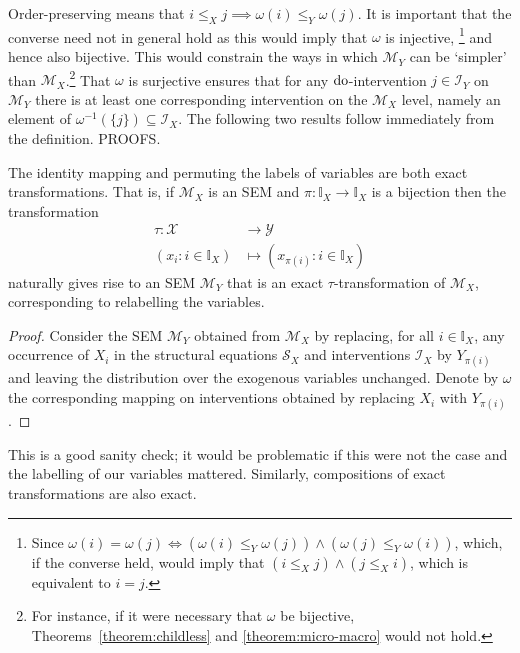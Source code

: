 Order-preserving means that ${i \leq_X j \implies \omega(i) \leq_Y \omega(j)}$.
It is important that the converse need not in general hold as this would imply that $\omega$ is injective,%
\footnote{Since ${\omega(i)=\omega(j) \iff \left(\omega(i) \leq_Y \omega(j)\right) \land \left(\omega(j) \leq_Y \omega(i)\right)}$, which, if the converse held, would imply that $\left(i \leq_X j\right) \land \left(j \leq_X i\right)$, which is equivalent to $i=j$.}
and hence also bijective.
This would constrain the ways in which $\mathcal{M}_Y$ can be `simpler' than $\mathcal{M}_X$.\footnote{For instance, if it were necessary that $\omega$ be bijective, Theorems~\ref{theorem:childless} and \ref{theorem:micro-macro} would not hold.}
That $\omega$ is surjective ensures that for any $\operatorname{do}$-intervention $j \in \mathcal{I}_Y$ on $\mathcal{M}_Y$ there is at least one corresponding intervention on the $\mathcal{M}_X$ level, namely an element of $\omega^{-1}(\{j\}) \subseteq \mathcal{I}_X$.
The following two results follow immediately from the definition. PROOFS.
\medskip

\begin{lemma}\label{lemma:elementary}
The identity mapping and permuting the labels of variables are both exact transformations.
That is, if $\mathcal{M}_X$ is an SEM and $\pi:\mathbb{I}_X \to \mathbb{I}_X$ is a bijection then the transformation
\begin{align*}
\tau:\mathcal{X}&\to\mathcal{Y}\\
(x_i:i\in\mathbb{I}_X) &\mapsto (x_{\pi(i)}:i\in\mathbb{I}_X)
\end{align*}
naturally gives rise to an SEM $\mathcal{M}_Y$ that is an exact $\tau$-transformation of $\mathcal{M}_X$, corresponding to relabelling the variables.
\end{lemma}

\begin{proof}
Consider the SEM $\mathcal{M}_Y$ obtained from $\mathcal{M}_X$ by replacing, for all $i\in\mathbb{I}_X$, any occurrence of $X_i$ in the structural equations $\mathcal{S}_X$ and interventions $\mathcal{I}_X$ by $Y_{\pi(i)}$ and leaving the distribution over the exogenous variables unchanged. Denote by $\omega$ the corresponding mapping on interventions obtained by replacing $X_i$ with $Y_{\pi(i)}$.
\end{proof}

This is a good sanity check; it would be problematic if this were not the case and the labelling of our variables mattered. Similarly, compositions of exact transformations are also exact.

